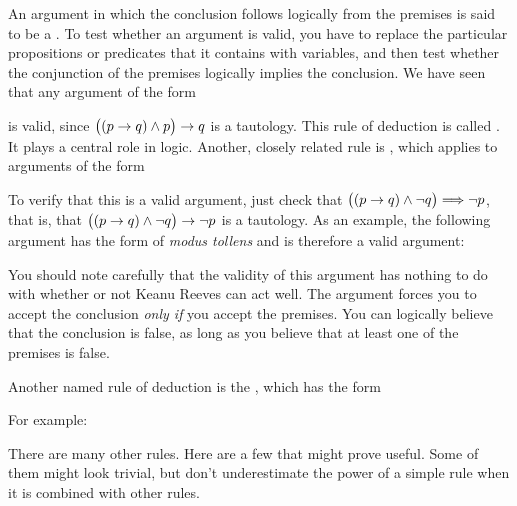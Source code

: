 An argument in which the conclusion follows logically from the
premises is said to be a .  To test whether
an argument is valid, you have to replace the particular propositions
or predicates that it contains with variables, and then test
whether the conjunction of the premises logically implies the
conclusion.  We have seen that any argument of the form
\begin{center}
\end{center}
is valid, since $\big((p\rightarrow q)\wedge p\big)\rightarrow q$ is a tautology.
This rule of deduction is called .  It plays a central
role in logic.  Another, closely related rule is ,
which applies to arguments of the form
\begin{center}
\end{center}
To verify that this is a valid argument, just check that
$\big((p\rightarrow q)\wedge \lnot q\big)\Longrightarrow \lnot p$, that is, that
$\big((p\rightarrow q)\wedge \lnot q\big)\rightarrow \lnot p$ is a tautology.
As an example, the following argument has the form of \textit{modus tollens}
and is therefore a valid argument:
\begin{center}
\end{center}
You should note carefully that the validity of this argument has nothing
to do with whether or not Keanu Reeves can act well.  The argument forces
you to accept the conclusion \emph{only if} you accept the premises.
You can logically believe that the conclusion is false, as long as
you believe that at least one of the premises is false.

Another named rule of deduction is the , which has the form
\begin{center}
\end{center}
For example:
\begin{center}
\end{center}

There are many other rules.  Here are a few that might prove useful.
Some of them might look trivial, but don't underestimate the power
of a simple rule when it is combined with other rules.
\begin{center}
\mbox{
\qquad
{}\qquad
{}\qquad
{}
}
\end{center}



